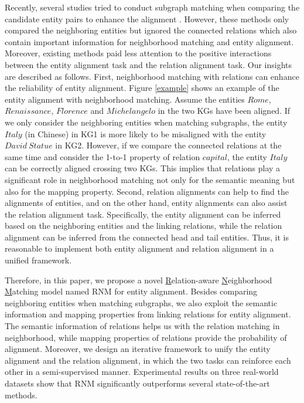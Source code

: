\documentclass[letterpaper]{article} %
\begin{document}
Recently, several studies tried to conduct subgraph matching when
comparing the candidate entity pairs to enhance the alignment
\cite{xu2019cross, wu2020neighborhood}. However, these methods only
compared the neighboring entities but ignored the connected
relations which also contain important information for neighborhood
matching and entity alignment. Moreover, existing methods paid less
attention to the positive interactions between the entity alignment
task and the relation alignment task. Our insights are described as
follows. First, neighborhood matching with relations can enhance the
reliability of entity alignment. Figure \ref{example} shows an
example of the entity alignment with neighborhood matching. Assume
the entities $Rome$, $Renaissance$, $Florence$ and $Michelangelo$
in the two KGs have been aligned. If we only
consider the neighboring entities when matching subgraphs, the
entity $Italy$ (in Chinese) in KG1 is more likely to be misaligned
with the entity $David\ Statue$ in KG2. However, if we compare the
connected relations at the same time and consider the 1-to-1
property of relation $capital$, the entity $Italy$ can be correctly
aligned crossing two KGs. This implies that relations play a
significant role in neighborhood matching not only for the semantic
meaning but also for the mapping property. Second, relation
alignments can help to find the alignments of entities, and on the
other hand, entity alignments can also assist the relation alignment
task. Specifically, the entity alignment can be inferred based on
the neighboring entities and the linking relations, while the
relation alignment can be inferred from the connected head and tail
entities. Thus, it is reasonable to implement both entity alignment
and relation alignment in a unified framework.

Therefore, in this paper, we propose a novel
\underline{R}elation-aware \underline{N}eighborhood
\underline{M}atching model named RNM for entity alignment. Besides
comparing neighboring entities when matching subgraphs, we also
exploit the semantic information and mapping properties from linking
relations for entity alignment. The semantic information of
relations helps us with the relation matching in neighborhood, while
mapping properties of relations provide the probability of
alignment. Moreover, we design an iterative framework to unify the
entity alignment and the relation alignment, in which the two tasks
can reinforce each other in a semi-supervised manner. Experimental
results on three real-world datasets show that RNM significantly
outperforms several state-of-the-art methods.
\end{document}
